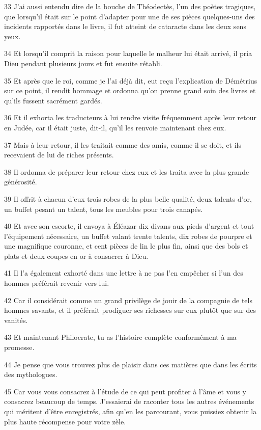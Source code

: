 \par 33 J'ai aussi entendu dire de la bouche de Théodectès, l'un des poètes tragiques, que lorsqu'il était sur le point d'adapter pour une de ses pièces quelques-uns des incidents rapportés dans le livre, il fut atteint de cataracte dans les deux sens yeux.

\par 34 Et lorsqu'il comprit la raison pour laquelle le malheur lui était arrivé, il pria Dieu pendant plusieurs jours et fut ensuite rétabli.

\par 35 Et après que le roi, comme je l'ai déjà dit, eut reçu l'explication de Démétrius sur ce point, il rendit hommage et ordonna qu'on prenne grand soin des livres et qu'ils fussent sacrément gardés.

\par 36 Et il exhorta les traducteurs à lui rendre visite fréquemment après leur retour en Judée, car il était juste, dit-il, qu'il les renvoie maintenant chez eux.

\par 37 Mais à leur retour, il les traitait comme des amis, comme il se doit, et ils recevaient de lui de riches présents.

\par 38 Il ordonna de préparer leur retour chez eux et les traita avec la plus grande générosité.

\par 39 Il offrit à chacun d'eux trois robes de la plus belle qualité, deux talents d'or, un buffet pesant un talent, tous les meubles pour trois canapés.

\par 40 Et avec son escorte, il envoya à Éléazar dix divans aux pieds d'argent et tout l'équipement nécessaire, un buffet valant trente talents, dix robes de pourpre et une magnifique couronne, et cent pièces de lin le plus fin, ainsi que des bols et plats et deux coupes en or à consacrer à Dieu.

\par 41 Il l'a également exhorté dans une lettre à ne pas l'en empêcher si l'un des hommes préférait revenir vers lui.

\par 42 Car il considérait comme un grand privilège de jouir de la compagnie de tels hommes savants, et il préférait prodiguer ses richesses sur eux plutôt que sur des vanités.

\par 43 Et maintenant Philocrate, tu as l'histoire complète conformément à ma promesse.

\par 44 Je pense que vous trouvez plus de plaisir dans ces matières que dans les écrits des mythologues.

\par 45 Car vous vous consacrez à l'étude de ce qui peut profiter à l'âme et vous y consacrez beaucoup de temps. J'essaierai de raconter tous les autres événements qui méritent d'être enregistrés, afin qu'en les parcourant, vous puissiez obtenir la plus haute récompense pour votre zèle.


